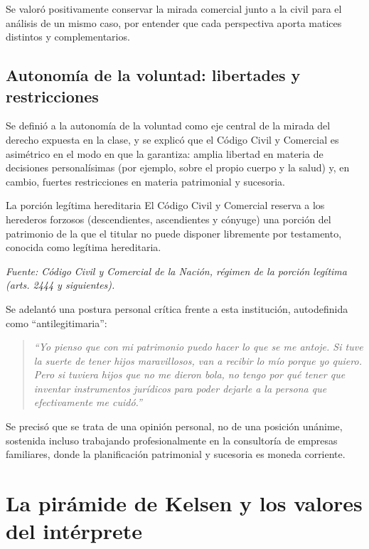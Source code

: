 \documentclass[12pt,oneside]{book}
\begin{document}
Se valoró positivamente conservar la mirada comercial junto a la civil para el análisis de un mismo caso, por entender que cada perspectiva aporta matices distintos y complementarios.

\subsection{Autonomía de la voluntad: libertades y restricciones}

Se definió a la autonomía de la voluntad como eje central de la mirada del derecho expuesta en la clase, y se explicó que el Código Civil y Comercial es asimétrico en el modo en que la garantiza: amplia libertad en materia de decisiones personalísimas (por ejemplo, sobre el propio cuerpo y la salud) y, en cambio, fuertes restricciones en materia patrimonial y sucesoria.

\begin{definition}{La porción legítima hereditaria}
El Código Civil y Comercial reserva a los herederos forzosos (descendientes, ascendientes y cónyuge) una porción del patrimonio de la que el titular no puede disponer libremente por testamento, conocida como legítima hereditaria.

\textit{Fuente: Código Civil y Comercial de la Nación, régimen de la porción legítima (arts. 2444 y siguientes).}
\end{definition}

Se adelantó una postura personal crítica frente a esta institución, autodefinida como ``antilegitimaria'':

\begin{quote}
\textit{``Yo pienso que con mi patrimonio puedo hacer lo que se me antoje. Si tuve la suerte de tener hijos maravillosos, van a recibir lo mío porque yo quiero. Pero si tuviera hijos que no me dieron bola, no tengo por qué tener que inventar instrumentos jurídicos para poder dejarle a la persona que efectivamente me cuidó.''}
\end{quote}

Se precisó que se trata de una opinión personal, no de una posición unánime, sostenida incluso trabajando profesionalmente en la consultoría de empresas familiares, donde la planificación patrimonial y sucesoria es moneda corriente.

\section{La pirámide de Kelsen y los valores del intérprete}
\end{document}
